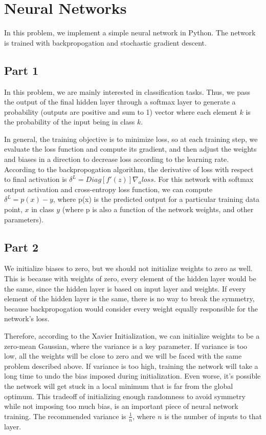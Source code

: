 \section{Neural Networks} \label{sec:prob1}
In this problem, we implement a simple neural network in Python.
The network is trained with backpropogation and stochastic gradient descent.

\subsection{Part 1}
In this problem, we are mainly interested in classification tasks.
Thus, we pass the output of the final hidden layer through a softmax layer to generate a probability (outputs are positive and sum to 1) vector where each element $k$ is the probability of the input being in class $k$.

In general, the training objective is to minimize loss, so at each training step, we evaluate the loss function and compute its gradient, and then adjust the weights and biases in a direction to decrease loss according to the learning rate.
According to the backpropogation algorithm, the derivative of loss with respect to final activation is $\delta^L = Diag[f'(z)] \nabla_a loss$.
For this network with softmax output activation and cross-entropy loss function, we can compute $\delta^L = p(x) - y$, where p(x) is the predicted output for a particular training data point, $x$ in class $y$ (where p is also a function of the network weights, and other parameters).


\subsection{Part 2}
We initialize biases to zero, but we should not initialize weights to zero as well.
This is because with weights of zero, every element of the hidden layer would be the same, since the hidden layer is based on input layer and weights.
If every element of the hidden layer is the same, there is no way to break the symmetry, because backpropogation would consider every weight equally responsible for the network's loss.

Therefore, according to the Xavier Initialization, we can initialize weights to be a zero-mean Gaussian, where the variance is a key parameter.
If variance is too low, all the weights will be close to zero and we will be faced with the same problem described above.
If variance is too high, training the network will take a long time to undo the bias imposed during initialization.
Even worse, it's possible the network will get stuck in a local minimum that is far from the global optimum.
This tradeoff of initializing enough randomness to avoid symmetry while not imposing too much bias, is an important piece of neural network training.
The recommended variance is $\frac{1}{n}$, where $n$ is the number of inputs to that layer.

